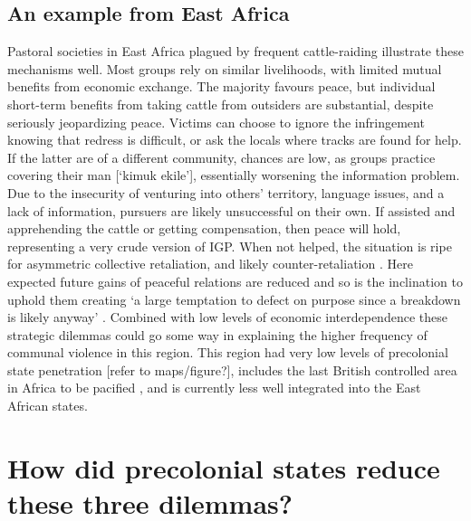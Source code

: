 \documentclass[12pt]{article}
\begin{document}
\subsection{An example from East Africa}

Pastoral societies in East Africa plagued by frequent cattle-raiding illustrate
these mechanisms well. Most groups rely on similar livelihoods, with limited
mutual benefits from economic exchange. The majority favours peace, but
individual short-term benefits from taking cattle from outsiders are
substantial, despite seriously jeopardizing peace. Victims can choose to ignore
the infringement knowing that redress is difficult, or ask the locals where
tracks are found for help. If the latter are of a different community, chances
are low, as groups practice covering their man [‘kimuk ekile’], essentially
worsening the information problem. Due to the insecurity of venturing into
others’ territory, language issues, and a lack of information, pursuers are
likely unsuccessful on their own. If assisted and apprehending the cattle or
getting compensation, then peace will hold, representing a very crude version of
IGP. When not helped, the situation is ripe for asymmetric collective
retaliation, and likely counter-retaliation \citep[104ff]{Eaton_2008}. Here
expected future gains of peaceful relations are reduced and so is the
inclination to uphold them creating ‘a large temptation to defect on purpose
since a breakdown is likely anyway’ \citep[724]{Fearon_1996}. Combined with low
levels of economic interdependence these strategic dilemmas could go some way in
explaining the higher frequency of communal violence in this region. This region
had very low levels of precolonial state penetration [refer to maps/figure?],
includes the last British controlled area in Africa to be pacified
\citep{Lamphear1992}, and is currently less well integrated into the East
African states. 


\section{How did precolonial states reduce these three dilemmas?}
\end{document}
